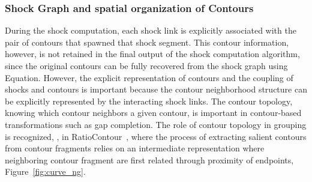 




\subsubsection{Shock Graph and spatial organization of Contours}



During the shock computation, each shock link is explicitly associated with the pair of contours that spawned that shock segment. This contour information, however, is not retained in the final output of the shock computation algorithm, since the original contours can be fully recovered from the shock graph using Equation. However, the explicit representation of contours and the coupling of shocks and contours is important because the contour neighborhood structure can be explicitly represented by the interacting shock links. The contour topology, knowing which contour neighbors a given contour, is important in contour-based transformations such as gap completion. The role of contour topology in grouping is recognized, \eg, in RatioContour~\cite{Wang:etal:PAMI05}, where the process of extracting salient contours from contour fragments relies on an intermediate representation where neighboring contour fragment are first related through proximity of endpoints, Figure~\ref{fig:curve_ng}. 


